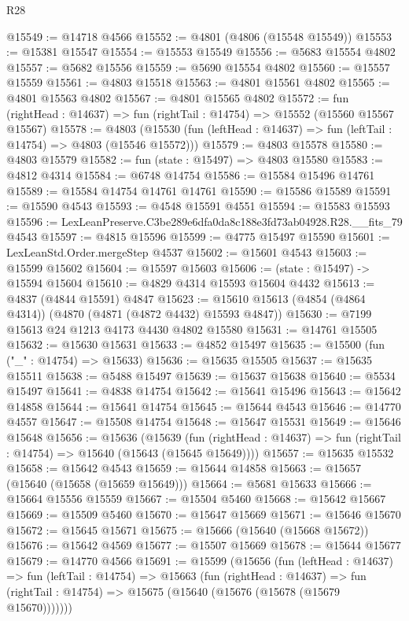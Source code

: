 \begin{lexlean}{R28}
\begin{coremodule}
@15549 := @14718 @4566
@15552 := @4801 (@4806 (@15548 @15549))
@15553 := @15381 @15547
@15554 := @15553 @15549
@15556 := @5683 @15554 @4802
@15557 := @5682 @15556
@15559 := @5690 @15554 @4802
@15560 := @15557 @15559
@15561 := @4803 @15518
@15563 := @4801 @15561 @4802
@15565 := @4801 @15563 @4802
@15567 := @4801 @15565 @4802
@15572 := fun (rightHead : @14637) => fun (rightTail : @14754) => @15552 (@15560 @15567 @15567)
@15578 := @4803
    (@15530 (fun (leftHead : @14637) => fun (leftTail : @14754) => @4803 (@15546 @15572)))
@15579 := @4803 @15578
@15580 := @4803 @15579
@15582 := fun (state : @15497) => @4803 @15580
@15583 := @4812 @4314
@15584 := @6748 @14754
@15586 := @15584 @15496 @14761
@15589 := @15584 @14754 @14761 @14761
@15590 := @15586 @15589
@15591 := @15590 @4543
@15593 := @4548 @15591 @4551
@15594 := @15583 @15593
@15596 := LexLeanPreserve.C3be289e6dfa0da8c188e3fd73ab04928.R28.__fits_79 @4543
@15597 := @4815 @15596
@15599 := @4775 @15497 @15590
@15601 := LexLeanStd.Order.mergeStep @4537
@15602 := @15601 @4543
@15603 := @15599 @15602
@15604 := @15597 @15603
@15606 := (state : @15497) -> @15594 @15604
@15610 := @4829 @4314 @15593 @15604 @4432
@15613 := @4837 (@4844 @15591) @4847
@15623 := @15610 @15613 (@4854 (@4864 @4314)) (@4870 (@4871 (@4872 @4432) @15593 @4847))
@15630 := @7199 @15613 @24 @1213 @4173 @4430 @4802 @15580
@15631 := @14761 @15505
@15632 := @15630 @15631
@15633 := @4852 @15497
@15635 := @15500 (fun ("_" : @14754) => @15633)
@15636 := @15635 @15505
@15637 := @15635 @15511
@15638 := @5488 @15497
@15639 := @15637 @15638
@15640 := @5534 @15497
@15641 := @4838 @14754
@15642 := @15641 @15496
@15643 := @15642 @14858
@15644 := @15641 @14754
@15645 := @15644 @4543
@15646 := @14770 @4557
@15647 := @15508 @14754
@15648 := @15647 @15531
@15649 := @15646 @15648
@15656 := @15636
    (@15639
      (fun (rightHead : @14637) => fun (rightTail : @14754) => @15640 (@15643 (@15645 @15649))))
@15657 := @15635 @15532
@15658 := @15642 @4543
@15659 := @15644 @14858
@15663 := @15657 (@15640 (@15658 (@15659 @15649)))
@15664 := @5681 @15633
@15666 := @15664 @15556 @15559
@15667 := @15504 @5460
@15668 := @15642 @15667
@15669 := @15509 @5460
@15670 := @15647 @15669
@15671 := @15646 @15670
@15672 := @15645 @15671
@15675 := @15666 (@15640 (@15668 @15672))
@15676 := @15642 @4569
@15677 := @15507 @15669
@15678 := @15644 @15677
@15679 := @14770 @4566
@15691 := @15599
    (@15656
      (fun (leftHead : @14637) =>
      fun (leftTail : @14754) =>
      @15663
        (fun (rightHead : @14637) =>
        fun (rightTail : @14754) => @15675 (@15640 (@15676 (@15678 (@15679 @15670)))))))

\end{coremodule}
\end{lexlean}
